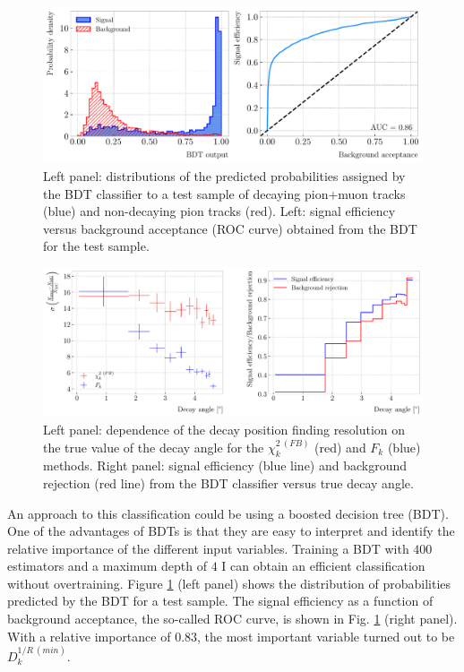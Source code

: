 \begin{figure}[t]
	\centering
	\includegraphics[width=.85\linewidth]{Images/GArSoft_PID/pion_decay/pion_decay_summary_bdt.pdf}
	\caption{Left panel: distributions of the predicted probabilities assigned by the BDT classifier to a test sample of decaying pion+muon tracks (blue) and non-decaying pion tracks (red). Left: signal efficiency versus background acceptance (ROC curve) obtained from the BDT for the test sample.}
	\label{fig:breakpoint_bdt}
\end{figure}

\begin{figure}[t]
	\centering
	\includegraphics[width=.85\linewidth]{Images/GArSoft_PID/pion_decay/pion_decay_angle_summary2.pdf}
	\caption{Left panel: dependence of the decay position finding resolution on the true value of the decay angle for the $\chi_{k}^{2 \ (FB)}$ (red) and $F_{k}$ (blue) methods. Right panel: signal efficiency (blue line) and background rejection (red line) from the BDT classifier versus true decay angle.}
	\label{fig:breakpoint_angle}
\end{figure}

An approach to this classification could be using a boosted decision tree (BDT). One of the advantages of BDTs is that they are easy to interpret and identify the relative importance of the different input variables. Training a BDT with $400$ estimators and a maximum depth of $4$ I can obtain an efficient classification without overtraining. Figure \ref{fig:breakpoint_bdt} (left panel) shows the distribution of probabilities predicted by the BDT for a test sample. The signal efficiency as a function of background acceptance, the so-called ROC curve, is shown in Fig. \ref{fig:breakpoint_bdt} (right panel). With a relative importance of $0.83$, the most important variable turned out to be $D_{k}^{1/R \ (min)}$.

